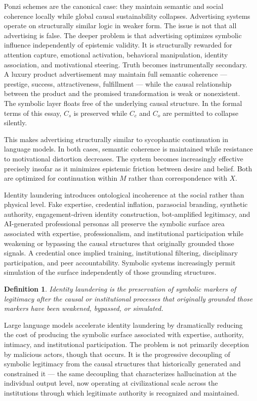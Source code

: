 \documentclass[12pt, a4paper]{article}
\newtheorem{definition}[theorem]{Definition}
\theoremstyle{remark}
\begin{document}
Ponzi schemes are the canonical case: they maintain semantic and social coherence locally while global causal sustainability collapses. Advertising systems operate on structurally similar logic in weaker form. The issue is not that all advertising is false. The deeper problem is that advertising optimizes symbolic influence independently of epistemic validity. It is structurally rewarded for attention capture, emotional activation, behavioral manipulation, identity association, and motivational steering. Truth becomes instrumentally secondary. A luxury product advertisement may maintain full semantic coherence --- prestige, success, attractiveness, fulfillment --- while the causal relationship between the product and the promised transformation is weak or nonexistent. The symbolic layer floats free of the underlying causal structure. In the formal terms of this essay, $C_s$ is preserved while $C_c$ and $C_o$ are permitted to collapse silently.

This makes advertising structurally similar to sycophantic continuation in language models. In both cases, semantic coherence is maintained while resistance to motivational distortion decreases. The system becomes increasingly effective precisely insofar as it minimizes epistemic friction between desire and belief. Both are optimized for continuation within $M$ rather than correspondence with $X$.

Identity laundering introduces ontological incoherence at the social rather than physical level. Fake expertise, credential inflation, parasocial branding, synthetic authority, engagement-driven identity construction, bot-amplified legitimacy, and AI-generated professional personas all preserve the symbolic surface area associated with expertise, professionalism, and institutional participation while weakening or bypassing the causal structures that originally grounded those signals. A credential once implied training, institutional filtering, disciplinary participation, and peer accountability. Symbolic systems increasingly permit simulation of the surface independently of those grounding structures.

\begin{definition}
\emph{Identity laundering} is the preservation of symbolic markers of legitimacy after the causal or institutional processes that originally grounded those markers have been weakened, bypassed, or simulated.
\end{definition}

Large language models accelerate identity laundering by dramatically reducing the cost of producing the symbolic surface associated with expertise, authority, intimacy, and institutional participation. The problem is not primarily deception by malicious actors, though that occurs. It is the progressive decoupling of symbolic legitimacy from the causal structures that historically generated and constrained it --- the same decoupling that characterizes hallucination at the individual output level, now operating at civilizational scale across the institutions through which legitimate authority is recognized and maintained.
\end{document}
